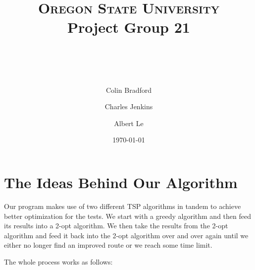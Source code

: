 \documentclass[paper=a4, fontsize=11pt]{scrartcl} %
\title{ 
    \normalfont \normalsize 
    \textsc{Oregon State University} \\ [25pt]
    \large Project Group 21
    \horrule{0.5pt} \\[0.4cm] %
    \huge \hwtitle \\ %
    \horrule{2pt} \\[0.5cm] %
}
\author{
    Colin Bradford
    \and
    Charles Jenkins
    \and
    Albert Le
} %
\date{\normalsize\today} %
\numberwithin{equation}{section} %
\numberwithin{figure}{section} %
\numberwithin{table}{section} %
\begin{document}
\maketitle %

\section{The Ideas Behind Our Algorithm}
Our program makes use of two different TSP algorithms in tandem to achieve better optimization for the tests. We start with a greedy algorithm and then feed its results into a 2-opt algorithm. We then take the results from the 2-opt algorithm and feed it back into the 2-opt algorithm over and over again until we either no longer find an improved route or we reach some time limit.\newline

The whole process works as follows:
\end{document}
